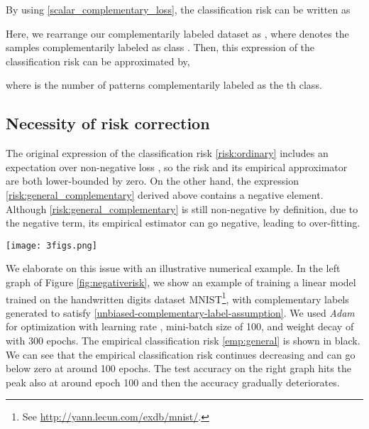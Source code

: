 \documentclass{article}
\begin{document}
By using \eqref{scalar_complementary_loss}, the classification risk can be written as

Here, we rearrange our complementarily labeled dataset as , where  denotes the samples complementarily labeled as class .
Then, this expression of the classification risk can be approximated by,

where  is the number of patterns complementarily labeled as the th class.

\subsection{Necessity of risk correction}
\label{sec:necessity}
The original expression of the classification risk \eqref{risk:ordinary} includes an expectation over non-negative loss , so the risk and its empirical approximator are both lower-bounded by zero.
On the other hand, the expression \eqref{risk:general_complementary} derived above contains a negative element. Although \eqref{risk:general_complementary} is still non-negative by definition, due to the negative term, its empirical estimator can go negative, leading to over-fitting.

\begin{figure*}
\centering
  \centering
  \texttt{[image: 3figs.png]}
  \caption{The left and middle graphs shows the total risk \eqref{emp:general} (in black color) and the risk decomposed into each \emph{ordinary} class term \eqref{eq:counterparts} (in other colors) for training data with linear and MLP models, respectively.
  The right graph shows the corresponding test accuracy for both models.}
  \label{fig:negativerisk}
\end{figure*}

We elaborate on this issue with an illustrative numerical example.
In the left graph of Figure \ref{fig:negativerisk}, we show an example of training a linear model trained on the handwritten digits dataset MNIST\footnote{See \url{http://yann.lecun.com/exdb/mnist/}.}, with complementary labels generated to satisfy \eqref{unbiased-complementary-label-assumption}.  We used \emph{Adam} \citep{kingma15iclr} for optimization with learning rate , mini-batch size of 100, and weight decay of  with 300 epochs.  The empirical classification risk \eqref{emp:general} is shown in black.
We can see that the empirical classification risk continues decreasing and can go below zero at around 100 epochs.  The test accuracy on the right graph hits the peak also at around epoch 100 and then the accuracy gradually deteriorates.
\end{document}
